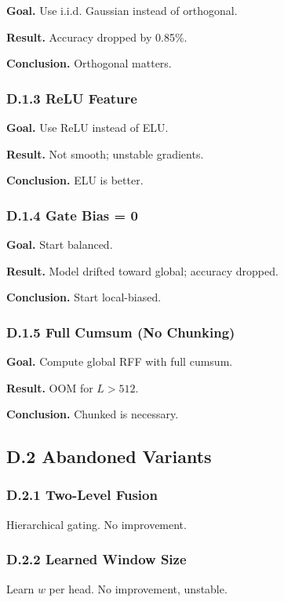 \textbf{Goal.} Use i.i.d. Gaussian instead of orthogonal.

\textbf{Result.} Accuracy dropped by 0.85\%.

\textbf{Conclusion.} Orthogonal matters.

\subsubsection{D.1.3 ReLU Feature}

\textbf{Goal.} Use ReLU instead of ELU.

\textbf{Result.} Not smooth; unstable gradients.

\textbf{Conclusion.} ELU is better.

\subsubsection{D.1.4 Gate Bias = 0}

\textbf{Goal.} Start balanced.

\textbf{Result.} Model drifted toward global; accuracy dropped.

\textbf{Conclusion.} Start local-biased.

\subsubsection{D.1.5 Full Cumsum (No Chunking)}

\textbf{Goal.} Compute global RFF with full cumsum.

\textbf{Result.} OOM for $L > 512$.

\textbf{Conclusion.} Chunked is necessary.

\subsection{D.2 Abandoned Variants}

\subsubsection{D.2.1 Two-Level Fusion}

Hierarchical gating. No improvement.

\subsubsection{D.2.2 Learned Window Size}

Learn $w$ per head. No improvement, unstable.

